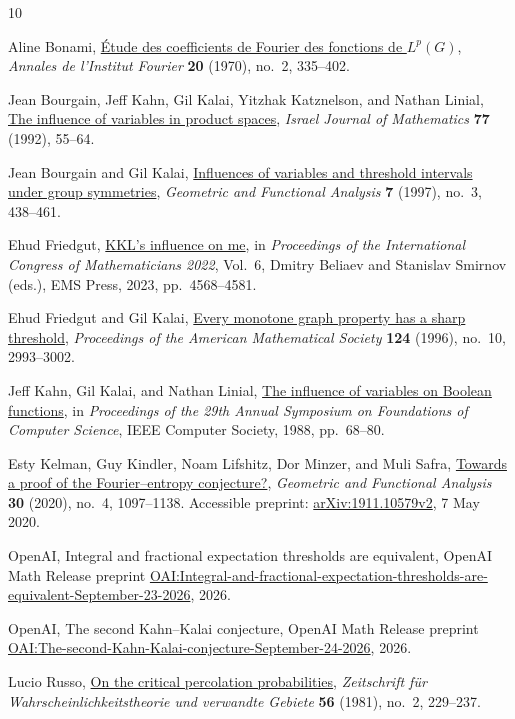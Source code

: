 \begin{thebibliography}{10}

Aline Bonami,
\href{https://doi.org/10.5802/aif.357}{\'Etude des coefficients de Fourier
des fonctions de \(L^p(G)\)},
\emph{Annales de l'Institut Fourier}
\textbf{20} (1970), no.~2, 335--402.

Jean Bourgain, Jeff Kahn, Gil Kalai, Yitzhak Katznelson, and Nathan Linial,
\href{https://doi.org/10.1007/BF02808010}{The influence of variables
in product spaces},
\emph{Israel Journal of Mathematics}
\textbf{77} (1992), 55--64.

Jean Bourgain and Gil Kalai,
\href{https://doi.org/10.1007/s000390050015}{Influences of variables and
threshold intervals under group symmetries},
\emph{Geometric and Functional Analysis}
\textbf{7} (1997), no.~3, 438--461.

Ehud Friedgut,
\href{https://doi.org/10.4171/ICM2022/78}{KKL's influence on me},
in \emph{Proceedings of the International Congress of Mathematicians 2022},
Vol.~6, Dmitry Beliaev and Stanislav Smirnov (eds.),
EMS Press, 2023, pp.~4568--4581.

Ehud Friedgut and Gil Kalai,
\href{https://doi.org/10.1090/S0002-9939-96-03732-X}{Every monotone graph
property has a sharp threshold},
\emph{Proceedings of the American Mathematical Society}
\textbf{124} (1996), no.~10, 2993--3002.

Jeff Kahn, Gil Kalai, and Nathan Linial,
\href{https://doi.org/10.1109/SFCS.1988.21923}{The influence of variables
on Boolean functions},
in \emph{Proceedings of the 29th Annual Symposium on Foundations of
Computer Science}, IEEE Computer Society, 1988, pp.~68--80.

Esty Kelman, Guy Kindler, Noam Lifshitz, Dor Minzer, and Muli Safra,
\href{https://doi.org/10.1007/s00039-020-00544-2}{Towards a proof of the
Fourier--entropy conjecture?},
\emph{Geometric and Functional Analysis}
\textbf{30} (2020), no.~4, 1097--1138.
Accessible preprint:
\href{https://arxiv.org/abs/1911.10579v2}{arXiv:1911.10579v2}, 7 May 2020.

OpenAI,
Integral and fractional expectation thresholds are equivalent,
OpenAI Math Release preprint
\href{https://github.com/openai/math/blob/main/preprints/Integral-and-fractional-expectation-thresholds-are-equivalent-September-23-2026/paper.pdf}{OAI:Integral-and-fractional-expectation-thresholds-are-equivalent-September-23-2026},
2026.

OpenAI,
The second Kahn--Kalai conjecture,
OpenAI Math Release preprint
\href{https://github.com/openai/math/blob/main/preprints/The-second-Kahn-Kalai-conjecture-September-24-2026/paper.pdf}{OAI:The-second-Kahn-Kalai-conjecture-September-24-2026},
2026.

Lucio Russo,
\href{https://doi.org/10.1007/BF00535742}{On the critical percolation probabilities},
\emph{Zeitschrift f\"ur Wahrscheinlichkeitstheorie und verwandte Gebiete}
\textbf{56} (1981), no.~2, 229--237.

\end{thebibliography}
